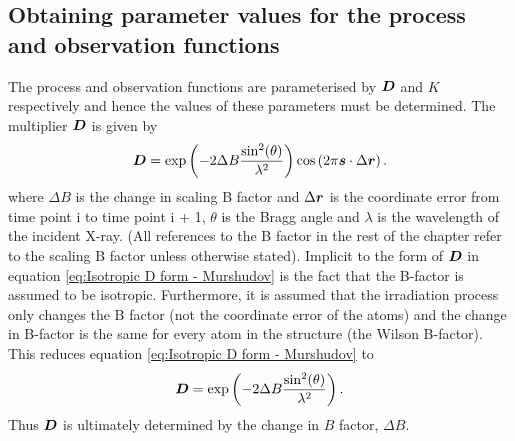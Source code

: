\subsection{Obtaining parameter values for the process and observation functions}
\label{sub:Obtaining parameter values for the process and observation functions}
The process and observation functions are parameterised by $\boldsymbol{D}$ and $K$ respectively and hence the values of these parameters must be determined.
The multiplier $\boldsymbol{D}$ is given by \cite{murshudov1997refinement,leal2012}
\begin{equation}
    \boldsymbol{D} = \exp \left( -2\Delta B \frac{\sin^2(\theta)}{\lambda^2} \right) \cos \left( 2 \pi \boldsymbol{s} \cdot \Delta \boldsymbol{r} \right).
    \label{eq:Isotropic D form - Murshudov}
\end{equation}
where $\Delta B$ is the change in scaling B factor and $\Delta \boldsymbol{r}$ is the coordinate error from time point i to time point i + 1, $\theta$ is the Bragg angle and $\lambda$ is the wavelength of the incident X-ray.
(All references to the B factor in the rest of the chapter refer to the scaling B factor unless otherwise stated).
Implicit to the form of $\boldsymbol{D}$ in equation \ref{eq:Isotropic D form - Murshudov} is the fact that the B-factor is assumed to be isotropic.
Furthermore, it is assumed that the irradiation process only changes the B factor (not the coordinate error of the atoms) and the change in B-factor is the same for every atom in the structure (the Wilson B-factor).
This reduces equation \ref{eq:Isotropic D form - Murshudov} to
\begin{equation}
    \boldsymbol{D} = \exp \left( -2\Delta B \frac{\sin^2(\theta)}{\lambda^2} \right).
    \label{eq:Reduced D form}
\end{equation}
Thus $\boldsymbol{D}$ is ultimately determined by the change in $B$ factor, $\Delta B$.

